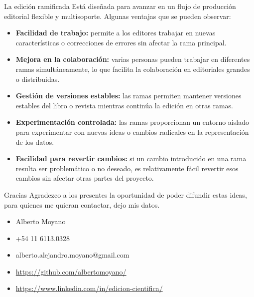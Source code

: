 \documentclass[14pt,aspectratio=169]{beamer}
\begin{document}
\begin{frame}[allowframebreaks]{La edición ramificada}
Está diseñada para avanzar en un flujo de producción editorial flexible y multisoporte. Algunas ventajas que se pueden observar:

\begin{itemize}
\item \textbf{Facilidad de trabajo:} permite a los editores trabajar en nuevas características o correcciones de errores sin afectar la rama principal.%
\item \textbf{Mejora en la colaboración:} varias personas pueden trabajar en diferentes ramas simultáneamente, lo que facilita la colaboración en editoriales grandes o distribuidas.%
\item \textbf{Gestión de versiones estables:} las ramas permiten mantener versiones estables del libro o revista mientras continúa la edición en otras ramas.
\item \textbf{Experimentación controlada:} las ramas proporcionan un entorno aislado para experimentar con nuevas ideas o cambios radicales en la representación de los datos.%
\item \textbf{Facilidad para revertir cambios:} si un cambio introducido en una rama resulta ser problemático o no deseado, es relativamente fácil revertir esos cambios sin afectar otras partes del proyecto.%
\end{itemize}
\end{frame}

\begin{frame}{Gracias}
	Agradezco a los presentes la oportunidad de poder difundir estas ideas, para quienes me quieran contactar, dejo mis datos.
\begin{itemize}
	\item Alberto Moyano
	\item +54 11 6113.0328
	\item alberto.alejandro.moyano@gmail.com
	\item \url{https://github.com/albertomoyano/}
	\item \url{https://www.linkedin.com/in/edicion-cientifica/}
\end{itemize}
\end{frame}

\end{document}
